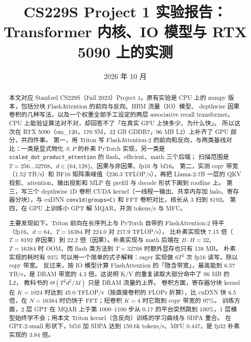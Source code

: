 \documentclass[11pt,a4paper]{ctexart}
\title{CS229S Project 1 实验报告：\\Transformer 内核、IO 模型与 RTX 5090 上的实测}
\author{\authorline}
\date{2026 年 10 月}
\begin{document}
\maketitle

\begin{abstract}
本文对应 Stanford CS229S（Fall 2023）Project 1。原有实验是 CPU 上的 numpy 版本，包括分块 FlashAttention 的前向与反向、HBM 流量（IO）模型、
depthwise 因果卷积的几种写法，以及一个权重全部手工设定的两层 associative recall transformer。CPU 上能验证算法对不对，却回答不了「在真实 GPU 上快多少、为什么快」。
所以这次在 RTX 5090（sm\_120，170 SM，32 GB GDDR7，96 MB L2）上补齐了 GPU 部分，共四件事。
第一，用 Triton 写 FlashAttention-2 的前向和反向，与两类基线对比：一类是显式物化 $S,P$ 的朴素 PyTorch 实现，另一类是 \texttt{scaled\_dot\_product\_attention} 的 flash、efficient、math 三个后端；
扫描范围是 $T=256\ldots32768$、$d\in\{64,128\}$、因果与非因果、fp16 与 bf16。
第二，实测 copy 带宽（1.52 TB/s）和 BF16 矩阵乘峰值（236.3 TFLOP/s），再把 Llama-2-7B 一层的 QKV 投影、attention、输出投影和 MLP 在 prefill 与 decode 形状下画到 roofline 上。
第三，写三个 depthwise 1D 卷积 CUDA kernel（一线程一输出、共享内存加 halo、寄存器分块），与 cuDNN \texttt{conv1d(groups=C)} 和 FFT 卷积对比，核长从 3 扫到 8192。
第四，在 GPU 上训练小 GPT 解 MQAR，并测 tokens/s 与 MFU。

主要发现如下。Triton 前向在长序列上与 PyTorch 自带的 FlashAttention-2 持平（fp16、$d=64$、$T=16384$ 时 224.0 对 217.9 TFLOP/s），
比朴素实现快 7.15 倍（$T=8192$ 非因果）到 22.2 倍（因果）。朴素实现与 math 后端在 $B\cdot H=32$、$T=16384$ 时 OOM，而 flash 类方法到 $T=32768$ 时额外显存也只有 138 MB。
朴素实现的耗时有 93\% 可以用一个简单的式子解释：eager 实现做 $6T^2$ 次 fp16 读写，除以 copy 带宽。
反过来，按 IO 模型计算 FlashAttention 的「隐含带宽」，最高能到 6.57 TB/s，是 DRAM 带宽的 4.3 倍。这说明 K/V 的重复读取大部分命中了 96 MB 的 L2，
教科书的 $\Theta(T^2d^2/M)$ 只是 DRAM 流量的上界。
卷积方面，寄存器分块 kernel 在 $K=1024$ 时达到 45.0 TFLOP/s（按直接卷积的 FLOPs 折算），比 cuDNN 快 6.5 倍，在 $N=16384$ 时仍快于 FFT；短卷积 $K=4$ 时它跑到 copy 带宽的 97\%。
训练方面，2 层 GPT 在 MQAR 上于第 1000–1100 步从 0.17 的平台突然跳到 100\%，1 层模型始终学不会；用本文 Triton kernel（含反向）训练的学习曲线与 SDPA 重合。
在 GPT-2-small 形状下，bf16 加 SDPA 达到 159.6k tokens/s、MFU 0.447，是 fp32 朴素实现的 3.84 倍。
\end{abstract}

\tableofcontents
\clearpage

\end{document}

